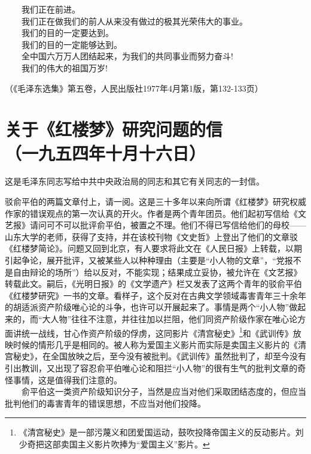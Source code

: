 \documentclass[cn,11pt,chinese]{elegantbook}
\def\myformat#1{\hfil\hfil #1}
\begin{document}
　　我们正在前进。\\
　　我们正在做我们的前人从来没有做过的极其光荣伟大的事业。\\
　　我们的目的一定要达到。\\
　　我们的目的一定能够达到。\\
　　全中国六万万人团结起来，为我们的共同事业而努力奋斗!\\
　　我们的伟大的祖国万岁!\\
\begin{flushright}（《毛泽东选集》第五卷，人民出版社1977年4月第1版，第132-133页）\end{flushright}
\newpage\section*{\myformat{关于《红楼梦》研究问题的信}\\\myformat{（一九五四年十月十六日）}}
\begin{introduction}\item  这是毛泽东同志写给中共中央政治局的同志和其它有关同志的一封信。\end{introduction}
驳俞平伯的两篇文章付上，请一阅。这是三十多年以来向所谓《红楼梦》研究权威作家的错误观点的第一次认真的开火。作者是两个青年团员。他们起初写信给《文艺报》请问可不可以批评俞平伯，被置之不理。他们不得已写信给他们的母校——山东大学的老师，获得了支持，并在该校刊物《文史哲》上登出了他们的文章驳《红楼梦简论》。问题又回到北京，有人要求将此文在《人民日报》上转载，以期引起争论，展开批评，又被某些人以种种理由（主要是“小人物的文章”，“党报不是自由辩论的场所”）给以反对，不能实现；结果成立妥协，被允许在《文艺报》转载此文。嗣后，《光明日报》的《文学遗产》栏又发表了这两个青年的驳俞平伯《红楼梦研究》一书的文章。看样子，这个反对在古典文学领域毒害青年三十余年的胡适派资产阶级唯心论的斗争，也许可以开展起来了。事情是两个“小人物”做起来的，而“大人物”往往不注意，并往往加以拦阻，他们同资产阶级作家在唯心论方面讲统一战线，甘心作资产阶级的俘虏，这同影片《清宫秘史》\footnote[1]{《清宫秘史》是一部污蔑义和团爱国运动，鼓吹投降帝国主义的反动影片。刘少奇把这部卖国主义影片吹捧为“爱国主义”影片。}和《武训传》放映时候的情形几乎是相同的。被人称为爱国主义影片而实际是卖国主义影片的《清宫秘史》，在全国放映之后，至今没有被批判。《武训传》虽然批判了，却至今没有引出教训，又出现了容忍俞平伯唯心论和阻拦“小人物”的很有生气的批判文章的奇怪事情，这是值得我们注意的。\\
　　俞平伯这一类资产阶级知识分子，当然是应当对他们采取团结态度的，但应当批判他们的毒害青年的错误思想，不应当对他们投降。\\
\end{document}
